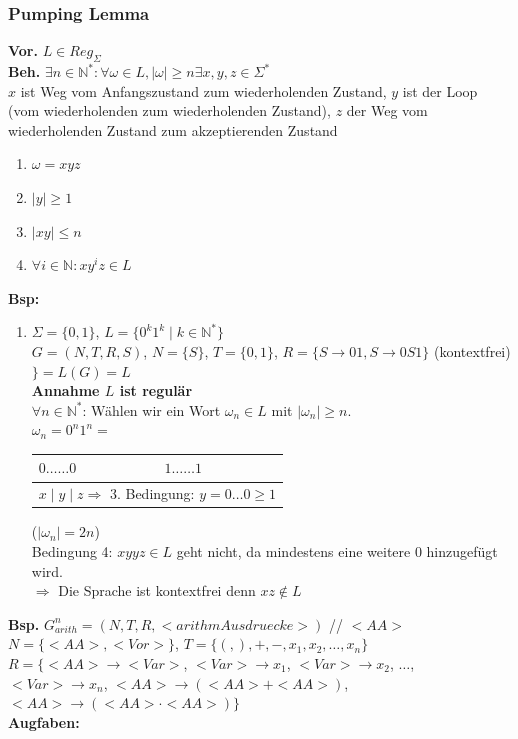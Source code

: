 \documentclass[10pt]{article}
\newcommand{\NN}{\mathbb{N}} %
\newcommand{\Bold}[1]{\textbf{#1}} %
\newcommand{\Ra}{\Rightarrow}
\begin{document}
\subsubsection{Pumping Lemma}
\Bold{Vor.} $L\in Reg_\Sigma$\\
\Bold{Beh.} $\exists n \in \NN^*: \forall\omega\in L,\mid\omega\mid\geq n\exists x,y,z\in\Sigma^*$\\
$x$ ist Weg vom Anfangszustand zum wiederholenden Zustand, $y$ ist der Loop (vom wiederholenden zum wiederholenden Zustand), $z$ der Weg vom wiederholenden Zustand zum akzeptierenden Zustand
\begin{enumerate}
 \item $\omega=xyz$
 \item $\mid y\mid \geq 1$
 \item $\mid xy\mid\leq n$
 \item $\forall i\in \NN: xy^iz\in L$
\end{enumerate}
\Bold{Bsp:}
\begin{enumerate}
 \item $\Sigma=\{0,1\}$, $L=\{0^k1^k\mid k\in \NN^*\}$\\
 $G=(N,T,R,S)$, $N=\{S\}$, $T=\{0,1\}$, $R=\{S\to 01,S\to0S1\}$ (kontextfrei) $\} = L(G)=L$\\
 \Bold{Annahme $L$ ist regul\"ar}\\
 $\forall n\in\NN^*$: W\"ahlen wir ein Wort $\omega_n\in L$ mit $\mid\omega_n\mid\geq n$.\\
 $\omega_n=0^n1^n=$
 \begin{tabular}{|l|l|}
  $0\dots\dots0$&$1\dots\dots1$\\\hline
  \multicolumn{2}{|l|}{$x\mid y\mid z\Ra$ 3. Bedingung: $y=0\dots0\geq1$}
 \end{tabular}
  ($\mid\omega_n\mid=2n$)\\
  Bedingung 4: $xyyz\in L$ geht nicht, da mindestens eine weitere 0 hinzugef\"ugt wird.\\
  $\Ra $ Die Sprache ist kontextfrei denn $xz\notin L$
\end{enumerate}
\Bold{Bsp.} $G_{arith}^n=(N,T,R,<arithm Ausdruecke>)$ // $<AA>$\\
$N=\{<AA>,<Vor>\}$, $T=\{(,),+,-,x_1,x_2,\dots,x_n\}$\\
$R=\{<AA>\to<Var>$, $<Var>\to x_1$, $<Var>\to x_2$, $\dots$, $<Var>\to x_n$, $<AA>\to(<AA>+<AA>)$, $<AA>\to(<AA>\cdot <AA>)\}$\\
\Bold{Augfaben:}
\end{document}
